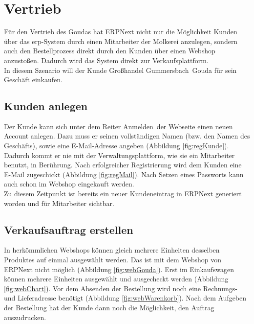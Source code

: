 \section{Vertrieb}
Für den Vertrieb des Goudas  hat ERPNext nicht nur die Möglichkeit Kunden über das \gls{erp}-System durch einen Mitarbeiter der Molkerei anzulegen, sondern auch den Bestellprozess direkt durch den Kunden über einen Webshop anzustoßen. Dadurch wird das System direkt zur Verkaufsplattform.\\
In diesem Szenario will der Kunde \glqq Großhandel Gummersbach\grqq\ Gouda für sein Geschäft einkaufen.

\subsection{Kunden anlegen}
Der Kunde kann sich unter dem Reiter \glqq Anmelden\grqq\ der Webseite einen neuen Account anlegen. Dazu muss er seinen vollständigen Namen (bzw. den Namen des Geschäfts), sowie eine E-Mail-Adresse angeben (\vgl Abbildung \ref{fig:regKunde}). Dadurch kommt er nie mit der Verwaltungsplattform, wie sie ein Mitarbeiter benutzt, in Berührung. Nach erfolgreicher Registrierung wird dem Kunden eine E-Mail zugeschickt (\vgl Abbildung \ref{fig:regMail}). Nach Setzen eines Passworts kann auch schon im Webshop eingekauft werden. \\ 
Zu diesem Zeitpunkt ist bereits ein neuer Kundeneintrag in ERPNext generiert worden und für Mitarbeiter sichtbar.

\subsection{Verkaufsauftrag erstellen}
In herkömmlichen Webshops können gleich mehrere Einheiten desselben Produktes auf einmal ausgewählt werden. Das ist mit dem Webshop von ERPNext nicht möglich (\vgl Abbildung \ref{fig:webGouda}). Erst im Einkaufswagen können mehrere Einheiten ausgewählt und ausgecheckt werden (\vgl Abbildung \ref{fig:webChart}). Vor dem Absenden der Bestellung wird noch eine Rechnungs- und Lieferadresse benötigt (\vgl Abbildung \ref{fig:webWarenkorb}). Nach dem Aufgeben der Bestellung hat der Kunde dann noch die Möglichkeit, den Auftrag auszudrucken.

